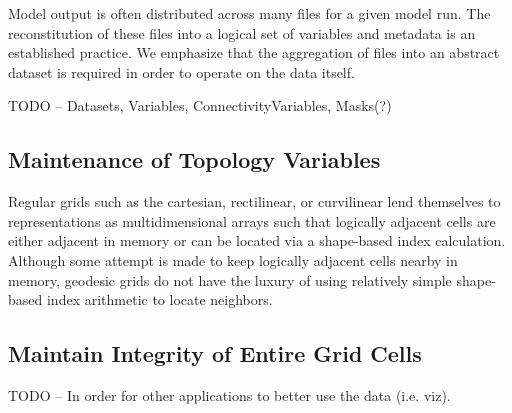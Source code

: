 Model output is often distributed across many files for a given model run.
The reconstitution of these files into a logical set of variables and metadata
is an established practice.\cite{NcML}\cite{THREDDS}  We emphasize that the
aggregation of files into an abstract dataset is required in order to
operate on the data itself.

TODO -- Datasets, Variables, ConnectivityVariables,
Masks(?)

\subsection{Maintenance of Topology Variables}

Regular grids such as the cartesian, rectilinear, or curvilinear lend
themselves to representations as multidimensional arrays such that logically
adjacent cells are either adjacent in memory or can be located via a
shape-based index calculation.  Although some attempt is made to keep
logically adjacent cells nearby in memory, geodesic grids do not have the
luxury of using relatively simple shape-based index arithmetic to locate
neighbors.

\subsection{Maintain Integrity of Entire Grid Cells}

TODO -- In order for other applications to better use the data (i.e. viz).
